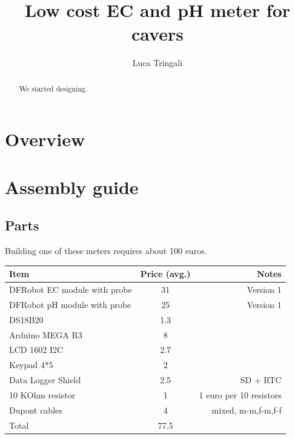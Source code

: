 \documentclass[]{article}
\begin{document}
\title{Low cost EC and pH meter for cavers}
\author{Luca Tringali}
\maketitle

\begin{abstract}
We started designing.
\end{abstract}

\section{Overview}

\section{Assembly guide}
\subsection{Parts}
Building one of these meters requires about 100 euros.

\begin{center}
\begin{tabular}{l||c|r}
Item & Price (avg.) & Notes \\ \hline
DFRobot EC module with probe & 31 & Version 1 \\
DFRobot pH module with probe & 25 & Version 1 \\
DS18B20 & 1.3 &  \\
Arduino MEGA R3 & 8 & \\
LCD 1602 I2C & 2.7 & \\
Keypad 4*5 & 2 & \\
Data Logger Shield & 2.5 & SD + RTC \\
10 KOhm resistor & 1 & 1 euro per 10 resistors \\
Dupont cables & 4 & mixed, m-m,f-m,f-f \\
Total & 77.5 & 
\end{tabular}
\end{center}
\end{document}
